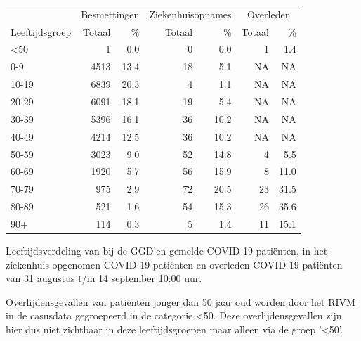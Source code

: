 \documentclass[
  english,
  man,floatsintext]{apa6}
\begin{document}
\begin{table}
\centering\begingroup\fontsize{11}{13}\selectfont

\begin{threeparttable}
\begin{tabular}{lrrrrrr}
\toprule
\multicolumn{1}{c}{ } & \multicolumn{2}{c}{Besmettingen} & \multicolumn{2}{c}{Ziekenhuisopnames} & \multicolumn{2}{c}{Overleden} \\
\cmidrule(l{3pt}r{3pt}){2-3} \cmidrule(l{3pt}r{3pt}){4-5} \cmidrule(l{3pt}r{3pt}){6-7}
Leeftijdsgroep & Totaal & \% & Totaal & \% & Totaal & \%\\
\midrule
<50 & 1 & 0.0 & 0 & 0.0 & 1 & 1.4\\
0-9 & 4513 & 13.4 & 18 & 5.1 & NA & NA\\
10-19 & 6839 & 20.3 & 4 & 1.1 & NA & NA\\
20-29 & 6091 & 18.1 & 19 & 5.4 & NA & NA\\
30-39 & 5396 & 16.1 & 36 & 10.2 & NA & NA\\
40-49 & 4214 & 12.5 & 36 & 10.2 & NA & NA\\
50-59 & 3023 & 9.0 & 52 & 14.8 & 4 & 5.5\\
60-69 & 1920 & 5.7 & 56 & 15.9 & 8 & 11.0\\
70-79 & 975 & 2.9 & 72 & 20.5 & 23 & 31.5\\
80-89 & 521 & 1.6 & 54 & 15.3 & 26 & 35.6\\
90+ & 114 & 0.3 & 5 & 1.4 & 11 & 15.1\\
\bottomrule
\end{tabular}
\begin{tablenotes}
\item[1] Leeftijdsverdeling van bij de GGD’en gemelde COVID-19 patiënten, in het ziekenhuis opgenomen COVID-19 patiënten en overleden COVID-19 patiënten van 31 augustus t/m 14 september 10:00 uur.
\item[2] Overlijdensgevallen van patiënten jonger dan 50 jaar oud worden door het RIVM in de casusdata gegroepeerd in de categorie <50. Deze overlijdensgevallen zijn hier dus niet zichtbaar in deze leeftijdsgroepen maar alleen via de groep '<50'.
\end{tablenotes}
\end{threeparttable}
\endgroup{}
\end{table}

\newpage
\end{document}
